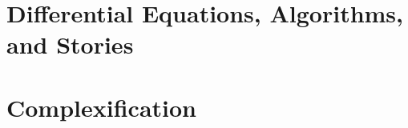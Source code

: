 
\cleartoleftpage
{}
\chapter{Differential Equations, Algorithms, and Stories}
\label{ch:pocsbook.stories}




\cleartoleftpage
{}
\chapter{Complexification}
\label{ch:pocsbook.complexification}


